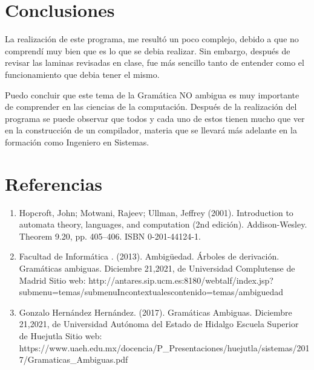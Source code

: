 \documentclass{article}
\begin{document}
	\section*{Conclusiones}
	La realización de este programa, me resultó un poco complejo, debido a que no comprendí muy bien que es lo que se debia realizar. Sin embargo, después de revisar las laminas revisadas en clase, fue más sencillo tanto de entender como el funcionamiento que debia tener el mismo.
	
	Puedo concluir que este tema de la Gramática NO ambigua es muy importante de comprender en las ciencias de la computación. Después de la realización del programa se puede observar que todos y cada uno de estos tienen mucho que ver en la construcción de un compilador, materia que se llevará más adelante en la formación como Ingeniero en Sistemas.
	
	\section*{Referencias}
	\begin{enumerate}
		\item Hopcroft, John; Motwani, Rajeev; Ullman, Jeffrey (2001). Introduction to automata theory, languages, and computation (2nd edición). Addison-Wesley. Theorem 9.20, pp. 405–406. ISBN 0-201-44124-1.
		\item Facultad de Informática . (2013). Ambigüedad. Árboles de derivación. Gramáticas ambiguas. Diciembre 21,2021, de Universidad Complutense de Madrid Sitio web: http://antares.sip.ucm.es:8180/webtalf/index.jsp?submenu=temas/submenuIncontextualescontenido=temas/ambiguedad
		\item Gonzalo Hernández Hernández. (2017). Gramáticas Ambiguas. Diciembre 21,2021, de Universidad Autónoma del Estado de Hidalgo Escuela Superior de Huejutla Sitio web: https://www.uaeh.edu.mx/docencia/P_Presentaciones/huejutla/sistemas/2017/Gramaticas_Ambiguas.pdf
		
	\end{enumerate}
	
\end{document}

